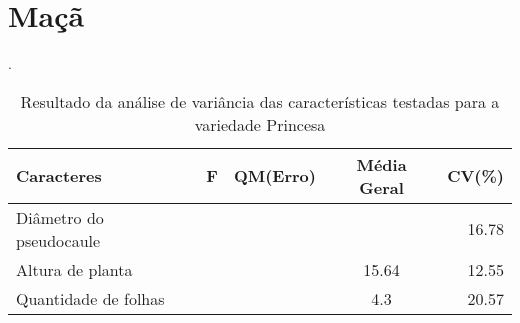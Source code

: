 \section{Maçã}
\begin{table}[!htb]
	\begin{center}
		\caption{Resultado da análise de variância das características testadas para a variedade Princesa}.
		\begin{tabular*}{\textwidth}{@{\extracolsep{\fill}}lcccr}
			\toprule
			\toprule
			\textbf{Caracteres} & \textbf{F}  & \textbf{QM(Erro)} & \textbf{Média Geral} &\textbf {CV(\%)} \\
			\hline
			Diâmetro do pseudocaule &&&& 16.78\\ 
			Altura de planta 		&&& 15.64 & 12.55\\
			Quantidade de folhas 	&&& 4.3 & 20.57\\
			\hline
			\hline
		\end{tabular*}
	\end{center}
\end{table}

